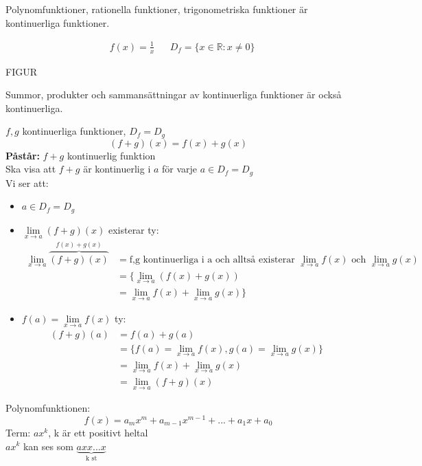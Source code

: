 \begin{Rem}
	Polynomfunktioner, rationella funktioner, trigonometriska funktioner är kontinuerliga funktioner.
\end{Rem}
\begin{Ex}
    \begin{align*}
    	&f(x) = \frac{1}{x} &&D_f = \{x \in \mathbb{R}: x \neq 0\}
    \end{align*}
    \begin{center}
    	FIGUR
    \end{center}
\end{Ex}
\begin{Rem}
	Summor, produkter och sammansättningar av kontinuerliga funktioner är också kontinuerliga.
\end{Rem}
\begin{Ex}
    $f,g$ kontinuerliga funktioner, $D_f = D_g$
    \[
    (f + g)(x) = f(x) + g(x)
    \]
    \textbf{Påstår:} $f+g$ kontinuerlig funktion\\
    Ska visa att $f+g$ är kontinuerlig i $a$ för varje $a \in D_f = D_g$\\
    Vi ser att:
    \begin{itemize}
    	\item $a \in D_f = D_g$
    	\item $\lim\limits_{x \to a}(f + g)(x)$ existerar ty:
    	\begin{align*}
    		\lim\limits_{x \to a}\overbrace{(f + g)(x)}^{f(x) + g(x)} &= \mbox{f,g kontinuerliga i a och alltså existerar $\lim\limits_{x \to a}f(x)$ och $\lim\limits_{x \to a}g(x)$} \\
    		&=\{\lim\limits_{x \to a}(f(x) + g(x)) \\
    		&= \lim\limits_{x \to a}f(x) + \lim\limits_{x \to a}g(x)\}
    	\end{align*}
    	\item $f(a) = \lim\limits_{x \to a}f(x)$ ty:
    	\begin{align*}
    		(f + g)(a) &= f(a) + g(a) \\
    		&= \{f(a) = \lim\limits_{x \to a}f(x), g(a) = \lim\limits_{x \to a}g(x)\}\\
    		&= \lim\limits_{x \to a}f(x) + \lim\limits_{x \to a}g(x) \\
    		&= \lim\limits_{x \to a}(f+g)(x)
    	\end{align*}
    \end{itemize}
\end{Ex}
\begin{Ex}
    Polynomfunktionen:
    \[
    f(x) = a_mx^m + a_{m-1}x^{m-1} + ... + a_1x + a_0
    \]
    Term: $ax^k$, k är ett positivt heltal\\
    $ax^k$ kan ses som $\underbrace{axx...x}_\text{k st}$
\end{Ex}
